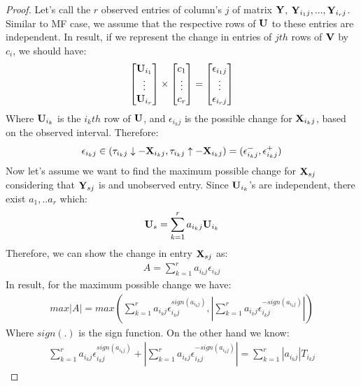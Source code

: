 \documentclass{article}
\begin{document}
\begin{thm:thm}
\begin{proof}
Let's call the $r$ observed entries of column's $j$ of matrix $\mathbf{Y}$, $\mathbf{Y}_{i_{1}j},...,\mathbf{Y}_{i_{r}j}$. Similar to MF case, we assume that the respective rows of $\mathbf{U}$ to these entries are independent. In result, if we represent the change in entries of $jth$ rows of $\mathbf{V}$ by $c_i$, we should have:
\begin{align}
\begin{bmatrix}
\mathbf{U}_{i_1}\\ 
\vdots \\ 
\mathbf{U}_{i_r}
\end{bmatrix}
\times
\begin{bmatrix}
c_1\\ 
\vdots \\ 
c_r
\end{bmatrix}
=
\begin{bmatrix}
\epsilon_{i_1j}\\ 
\vdots \\ 
\epsilon_{i_rj}
\end{bmatrix}
\end{align}            
Where $\mathbf{U}_{i_k}$ is the $i_k th$ row of $\mathbf{U}$, and $\epsilon_{i_kj}$ is the possible change for $\mathbf{X}_{i_{k}j}$, based on the observed interval. Therefore:
\begin{align}
\epsilon_{i_kj} \in (\tau_{i_kj}\downarrow-\mathbf{X}_{i_kj},\tau_{i_kj}\uparrow-\mathbf{X}_{i_kj})=(\epsilon_{i_kj}^-,\epsilon_{i_kj}^+)
\end{align}
Now let's assume we want to find the maximum possible change for $\mathbf{X}_{sj}$ considering that $\mathbf{Y}_{sj}$ is and unobserved entry. Since $\mathbf{U}_{i_k}$'s are independent, there exist $a_1,..a_r$ which:
\begin{align}
\mathbf{U}_s=\sum_{k=1}^{r}a_{i_kj}\mathbf{U}_{i_k}
\end{align}
Therefore, we can show the change in entry $\mathbf{X}_{sj}$ as:
\begin{align}
A=\sum_{k=1}^{r}a_{i_kj}\epsilon_{i_kj}
\end{align}
In result, for the maximum possible change we have:
\begin{align}
max|A|=max(\sum_{k=1}^{r}a_{i_kj}\epsilon_{i_kj}^{sign(a_{i_kj})},|\sum_{k=1}^{r}a_{i_kj}\epsilon_{i_kj}^{-sign(a_{i_kj})}|)
\end{align}
Where $sign(.)$ is the sign function. On the other hand we know:
\begin{align}
\sum_{k=1}^{r}a_{i_kj}\epsilon_{i_kj}^{sign(a_{i_kj})}+|\sum_{k=1}^{r}a_{i_kj}\epsilon_{i_kj}^{-sign(a_{i_kj})}|=\sum_{k=1}^{r}|a_{i_kj}|T_{i_kj}
\end{align}

\end{proof}
\end{thm:thm}
\end{document}
